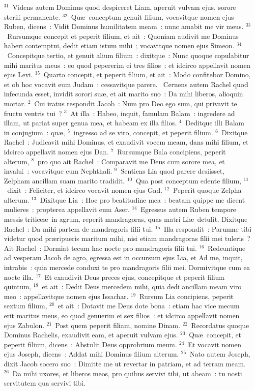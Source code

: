 ${}^{31}$~Videns autem Dominus quod despiceret Liam, aperuit vulvam ejus, sorore sterili permanente.
${}^{32}$~Qu\ae\ conceptum genuit filium, vocavitque nomen ejus Ruben, dicens~: Vidit Dominus humilitatem meam~: nunc amabit me vir meus.
${}^{33}$~Rursumque concepit et peperit filium, et ait~: Quoniam audivit me Dominus haberi contemptui, dedit etiam istum mihi~; vocavitque nomen ejus Simeon.
${}^{34}$~Concepitque tertio, et genuit alium filium~: dixitque~: Nunc quoque copulabitur mihi maritus meus~: eo quod pepererim ei tres filios~: et idcirco appellavit nomen ejus Levi.
${}^{35}$~Quarto concepit, et peperit filium, et ait~: Modo confitebor Domino, et ob hoc vocavit eum Judam~: cessavitque parere.
~Cernens autem Rachel quod infecunda esset, invidit sorori su\ae , et ait marito suo~: Da mihi liberos, alioquin moriar.
${}^{2}$~Cui iratus respondit Jacob~: Num pro Deo ego sum, qui privavit te fructu ventris tui~?
${}^{3}$~At illa~: Habeo, inquit, famulam Balam~: ingredere ad illam, ut pariat super genua mea, et habeam ex illa filios.
${}^{4}$~Deditque illi Balam in conjugium~: qu\ae ,
${}^{5}$~ingresso ad se viro, concepit, et peperit filium.
${}^{6}$~Dixitque Rachel~: Judicavit mihi Dominus, et exaudivit vocem meam, dans mihi filium, et idcirco appellavit nomen ejus Dan.
${}^{7}$~Rursumque Bala concipiens, peperit alterum,
${}^{8}$~pro quo ait Rachel~: Comparavit me Deus cum sorore mea, et invalui~: vocavitque eum Nephthali.
${}^{9}$~Sentiens Lia quod parere desiisset, Zelpham ancillam suam marito tradidit.
${}^{10}$~Qua post conceptum edente filium,
${}^{11}$~dixit~: Feliciter, et idcirco vocavit nomen ejus Gad.
${}^{12}$~Peperit quoque Zelpha alterum.
${}^{13}$~Dixitque Lia~: Hoc pro beatitudine mea~: beatam quippe me dicent mulieres~: propterea appellavit eum Aser.
${}^{14}$~Egressus autem Ruben tempore messis tritice\ae\ in agrum, reperit mandragoras, quas matri Li\ae\ detulit. Dixitque Rachel~: Da mihi partem de mandragoris filii tui.
${}^{15}$~Illa respondit~: Parumne tibi videtur quod pr\ae ripueris maritum mihi, nisi etiam mandragoras filii mei tuleris~? Ait Rachel~: Dormiat tecum hac nocte pro mandragoris filii tui.
${}^{16}$~Redeuntique ad vesperam Jacob de agro, egressa est in occursum ejus Lia, et Ad me, inquit, intrabis~: quia mercede conduxi te pro mandragoris filii mei. Dormivitque cum ea nocte illa.
${}^{17}$~Et exaudivit Deus preces ejus, concepitque et peperit filium quintum,
${}^{18}$~et ait~: Dedit Deus mercedem mihi, quia dedi ancillam meam viro meo~: appellavitque nomen ejus Issachar.
${}^{19}$~Rursum Lia concipiens, peperit sextum filium,
${}^{20}$~et ait~: Dotavit me Deus dote bona~: etiam hac vice mecum erit maritus meus, eo quod genuerim ei sex filios~: et idcirco appellavit nomen ejus Zabulon.
${}^{21}$~Post quem peperit filiam, nomine Dinam.
${}^{22}$~Recordatus quoque Dominus Rachelis, exaudivit eam, et aperuit vulvam ejus.
${}^{23}$~Qu\ae\ concepit, et peperit filium, dicens~: Abstulit Deus opprobrium meum.
${}^{24}$~Et vocavit nomen ejus Joseph, dicens~: Addat mihi Dominus filium alterum.
${}^{25}$~Nato autem Joseph, dixit Jacob socero suo~: Dimitte me ut revertar in patriam, et ad terram meam.
${}^{26}$~Da mihi uxores, et liberos meos, pro quibus servivi tibi, ut abeam~: tu nosti servitutem qua servivi tibi.


